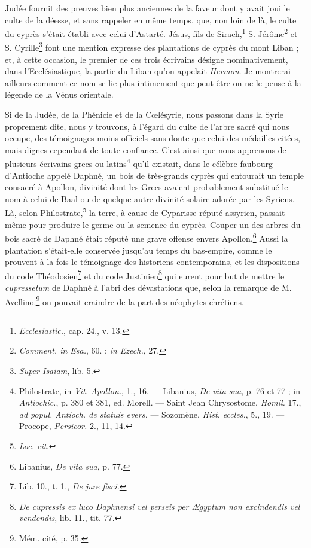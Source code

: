 \documentclass[a4paper, 11pt, oneside, polutonikogreek, french]{article}
\begin{document}
Judée fournit des preuves bien plus anciennes de la faveur dont y avait joui le culte de la déesse, et sans rappeler en même temps, que, non loin de là, le culte du cyprès s'était établi avec celui d'Astarté. Jésus, fils de Sirach,\footnote{\emph{Ecclesiastic.}, cap. 24., v. 13.} S. Jérôme\footnote{\emph{Comment. in Esa.}, 60. ; \emph{in Ezech.}, 27.} et S. Cyrille\footnote{\emph{Super Isaiam}, lib. 5.} font une mention expresse des plantations de cyprès du mont Liban ; et, à cette occasion, le premier de ces trois écrivains désigne nominativement, dans l'Ecclésiastique, la partie du Liban qu'on appelait \emph{Hermon}. Je montrerai ailleurs comment ce nom se lie plus intimement que peut-être on ne le pense à la légende de la Vénus orientale.

Si de la Judée, de la Phénicie et de la Cœlésyrie, nous passons dans la Syrie proprement dite, nous y trouvons, à l'égard du culte de l'arbre sacré qui nous occupe, des témoignages moins officiels sans doute que celui des médailles citées, mais dignes cependant de toute confiance. C'est ainsi que nous apprenons de plusieurs écrivains grecs ou latins\footnote{Philostrate, in \emph{Vit. Apollon.}, 1., 16. --- Libanius, \emph{De vita sua}, p. 76 et 77 ; in \emph{Antiochic.}, p. 380 et 381, ed. Morell. --- Saint Jean Chrysostome, \emph{Homil.} 17., \emph{ad popul. Antioch. de statuis evers.} --- Sozomène, \emph{Hist. eccles.}, 5., 19. --- Procope, \emph{Persicor.} 2., 11, 14.} qu'il existait, dans le célèbre faubourg d'Antioche appelé Daphné, un bois de très-grands cyprès qui entourait un temple consacré à Apollon, divinité dont les Grecs avaient probablement substitué le nom à celui de Baal ou de quelque autre divinité solaire adorée par les Syriens. Là, selon Philostrate,\footnote{\emph{Loc. cit.}} la terre, à cause de Cyparisse réputé assyrien, passait même pour produire le germe ou la semence du cyprès. Couper un des arbres du bois sacré de Daphné était réputé une grave offense envers Apollon.\footnote{Libanius, \emph{De vita sua}, p. 77.} Aussi la plantation s'était-elle conservée jusqu'au temps du bas-empire, comme le prouvent à la fois le témoignage des historiens contemporains, et les dispositions du code Théodosien\footnote{Lib. 10., t. 1., \emph{De jure fisci.}} et du code Justinien\footnote{\emph{De cupressis ex luco Daphnensi vel perseis per Ægyptum non excindendis vel vendendis}, lib. 11., tit. 77.} qui eurent pour but de mettre le \emph{cupressetum} de Daphné à l'abri des dévastations que, selon la remarque de M. Avellino,\footnote{Mém. cité, p. 35.} on pouvait craindre de la part des néophytes chrétiens.
\end{document}

